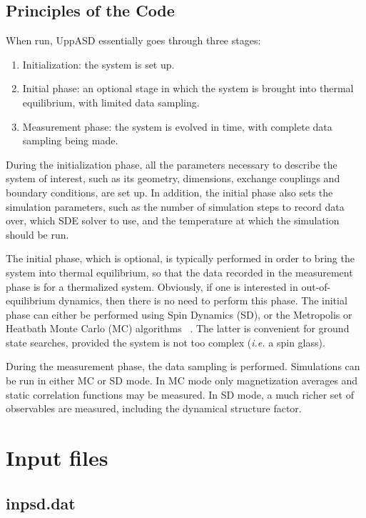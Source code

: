 \documentclass[11pt,fleqn,a4]{book} %
\begin{document}
\section{Principles of the Code}

When run, UppASD essentially goes through three stages:

\begin{enumerate}
\item Initialization: the system is set up.
\item Initial phase: an optional stage in which the system is brought into thermal equilibrium, with limited data sampling.
\item Measurement phase: the system is evolved in time, with complete data sampling being made.
\end{enumerate}

During the initialization phase, all the parameters necessary to describe the system of interest, such as its geometry, dimensions, exchange couplings and boundary conditions, are set up. In addition, the initial phase also sets the simulation parameters, such as the number of simulation steps to record data over, which SDE solver to use, and the temperature at which the simulation should be run.

The initial phase, which is optional, is typically performed in order to bring the system into thermal equilibrium, so that the data recorded in the measurement phase is for a thermalized system. Obviously, if one is interested in out-of-equilibrium dynamics, then there is no need to perform this phase. The initial phase can either be performed using Spin Dynamics (SD), or the Metropolis or Heatbath Monte Carlo (MC) algorithms ~\cite{Binder2009}. The latter is convenient for ground state searches, provided the system is not too complex (\textit{i.e.} a spin glass).

During the measurement phase, the data sampling is performed. Simulations can be run in either MC or SD mode. In MC mode only magnetization averages and static correlation functions may be measured. In SD mode, a much richer set of observables are measured, including the dynamical structure factor.


\chapter{Input files}
\section{inpsd.dat}\label{inpsd.dat}
\end{document}
